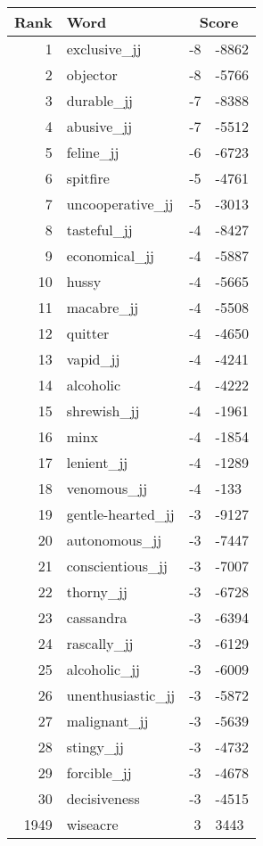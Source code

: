 \begin{longtable}[!htbp]{| rlr@{.}l |}
    \hline
    \textbf{Rank} & \textbf{Word} & \multicolumn{2}{c|}{\textbf{Score}} \\
    \hline
    \endhead
    1 & exclusive\_jj & -8 & -8862 \\
    2 & objector & -8 & -5766 \\
    3 & durable\_jj & -7 & -8388 \\
    4 & abusive\_jj & -7 & -5512 \\
    5 & feline\_jj & -6 & -6723 \\
    6 & spitfire & -5 & -4761 \\
    7 & uncooperative\_jj & -5 & -3013 \\
    8 & tasteful\_jj & -4 & -8427 \\
    9 & economical\_jj & -4 & -5887 \\
    10 & hussy & -4 & -5665 \\
    11 & macabre\_jj & -4 & -5508 \\
    12 & quitter & -4 & -4650 \\
    13 & vapid\_jj & -4 & -4241 \\
    14 & alcoholic & -4 & -4222 \\
    15 & shrewish\_jj & -4 & -1961 \\
    16 & minx & -4 & -1854 \\
    17 & lenient\_jj & -4 & -1289 \\
    18 & venomous\_jj & -4 & -133 \\
    19 & gentle-hearted\_jj & -3 & -9127 \\
    20 & autonomous\_jj & -3 & -7447 \\
    21 & conscientious\_jj & -3 & -7007 \\
    22 & thorny\_jj & -3 & -6728 \\
    23 & cassandra & -3 & -6394 \\
    24 & rascally\_jj & -3 & -6129 \\
    25 & alcoholic\_jj & -3 & -6009 \\
    26 & unenthusiastic\_jj & -3 & -5872 \\
    27 & malignant\_jj & -3 & -5639 \\
    28 & stingy\_jj & -3 & -4732 \\
    29 & forcible\_jj & -3 & -4678 \\
    30 & decisiveness & -3 & -4515 \\
    1949 & wiseacre & 3 & 3443 \\

\end{longtable}
